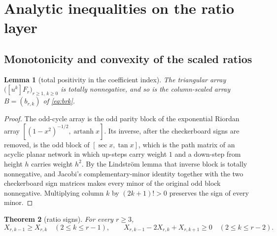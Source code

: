 \documentclass[11pt,a4paper]{article}
\theoremstyle{plain}
\newtheorem{theorem}{Theorem}[section]
\newtheorem{lemma}[theorem]{Lemma}
\theoremstyle{definition}
\theoremstyle{remark}
\DeclareMathOperator{\artanh}{artanh}
\begin{document}
\section{Analytic inequalities on the ratio layer}\label{sec:analytic}

\subsection{Monotonicity and convexity of the scaled ratios}

\begin{lemma}[total positivity in the coefficient index]\label{lem:tpcoeff}
The triangular array $\bigl([u^k]F_r\bigr)_{r\ge1,\,k\ge0}$ is totally
nonnegative, and so is the column-scaled array $B=(b_{r,k})$ of \eqref{eq:brk}.
\end{lemma}

\begin{proof}
The odd-cycle array is the odd parity block of the exponential Riordan array
$[(1-x^2)^{-1/2},\artanh x]$. Its inverse, after the checkerboard signs are
removed, is the odd block of $[\sec x,\tan x]$, which is the path matrix of an
acyclic planar network in which up-steps carry weight $1$ and a down-step from
height $h$ carries weight $h^2$. By the Lindstr\"om lemma that inverse block is
totally nonnegative, and Jacobi's complementary-minor identity together with the
two checkerboard sign matrices makes every minor of the original odd block
nonnegative. Multiplying column $k$ by $(2k+1)!>0$ preserves the sign of every
minor.
\end{proof}

\begin{theorem}[ratio signs]\label{thm:ratiosign}
For every $r\ge3$,
\[
  X_{r,k-1}\ge X_{r,k}\quad(2\le k\le r-1),
  \qquad
  X_{r,k-1}-2X_{r,k}+X_{r,k+1}\ge0\quad(2\le k\le r-2).
\]
\end{theorem}
\end{document}
